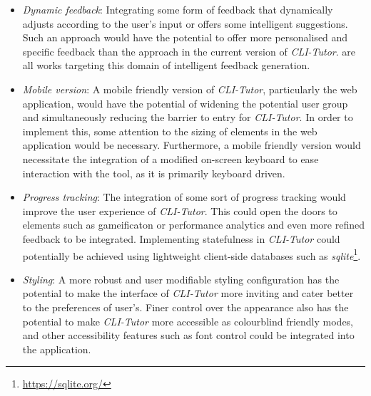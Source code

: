 \begin{itemize}

	\item  \textit{Dynamic feedback}: Integrating some form of feedback that
	      dynamically adjusts according to the user's input or offers some
	      intelligent suggestions. Such an approach would have the potential to
	      offer more personalised and specific feedback than the approach in the
	      current version of \textit{CLI-Tutor}. \cite{keuning2014strategy,
		      gerdes2017ask, rivers2017data} are all works targeting this domain of
	      intelligent feedback generation.

	\item \textit{Mobile version}: A mobile friendly version of
	      \textit{CLI-Tutor}, particularly the web application, would have the
	      potential of widening the potential user group and simultaneously
	      reducing the barrier to entry for \textit{CLI-Tutor}. In order to
	      implement this, some attention to the sizing of elements in the web
	      application would be necessary. Furthermore, a mobile friendly
	      version would necessitate the integration of a modified on-screen
	      keyboard to ease interaction with the tool, as it is primarily
	      keyboard driven.

	\item \textit{Progress tracking}: The integration of some sort of
	      progress tracking would improve the user experience of
	      \textit{CLI-Tutor}. This could open the doors to elements such as
	      gameificaton or performance analytics and even more refined feedback
	      to be integrated. Implementing statefulness in \textit{CLI-Tutor}
	      could potentially be achieved using lightweight client-side databases
	      such as \textit{sqlite}\footnote{\url{https://sqlite.org/}}.

      \item \textit{Styling}: A more robust and user modifiable styling
          configuration has the potential to make the interface of
          \textit{CLI-Tutor} more inviting and cater better to the preferences
          of user's. Finer control over the appearance also has the potential
          to make \textit{CLI-Tutor} more accessible as colourblind friendly
          modes, and other accessibility features such as font control could be
          integrated into the application. 

\end{itemize}


